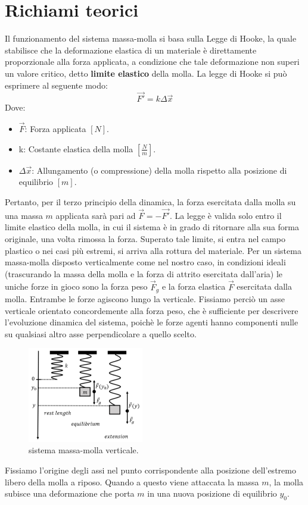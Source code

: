 \documentclass[11pt]{article}
\begin{document}
\section{Richiami teorici}
Il funzionamento del sistema massa-molla si basa sulla Legge di Hooke, la quale stabilisce che la deformazione elastica di un materiale è direttamente proporzionale alla forza applicata, a condizione che tale deformazione non superi un valore critico, detto \textbf{limite elastico} della molla. La legge di Hooke si può esprimere al seguente modo:
\begin{equation}
    \vec{F'} = k\Delta\vec{x}
\end{equation}
Dove:
\begin{itemize}
    \item $\vec{F}$: Forza applicata $[N]$.
    \item k: Costante elastica della molla $[\frac{N}{m}]$.
    \item $\Delta\vec{x}$: Allungamento (o compressione) della molla rispetto alla posizione di equilibrio $[m]$.
\end{itemize}
Pertanto, per il terzo principio della dinamica, la forza esercitata dalla molla su una massa $m$ applicata sarà pari ad $\vec{F} = -\vec{F'}$. La legge è valida solo entro il limite elastico della molla, in cui il sistema è in grado di ritornare alla sua forma originale, una volta rimossa la forza. Superato tale limite, si entra nel campo plastico o nei casi più estremi, si arriva alla rottura del materiale. Per un sistema massa-molla disposto verticalmente come nel nostro caso, in condizioni ideali (trascurando la massa della molla e la forza di attrito esercitata dall'aria) le uniche forze in gioco sono la forza peso $\vec{F}_g$ e la forza elastica $\vec{F}$ esercitata dalla molla. Entrambe le forze agiscono lungo la verticale. Fissiamo perciò un asse verticale orientato concordemente alla forza peso, che è sufficiente per descrivere l'evoluzione dinamica del sistema, poichè le forze agenti hanno componenti nulle su qualsiasi altro asse perpendicolare a quello scelto. 
\begin{figure}[H]
  \centering
  \includegraphics[width=0.45\textwidth]{sistema_massa_molla.png}
  \caption{sistema massa-molla verticale.}
\end{figure}
Fissiamo l'origine degli assi nel punto corrispondente alla posizione dell'estremo libero della molla a riposo. Quando a questo viene attaccata la massa $m$, la molla subisce una deformazione che porta $m$ in una nuova posizione di equilibrio $y_0$.
\end{document}
